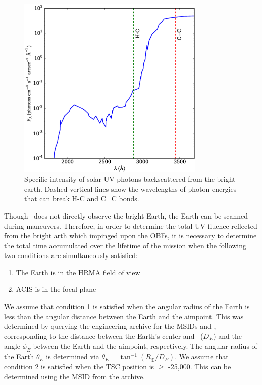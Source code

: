 \documentclass[11pt]{article}
\begin{document}
\begin{figure}
\begin{center}
\includegraphics[width=0.8\textwidth]{bright_earth_intensity.eps}
\caption{Specific intensity of solar UV photons backscattered from the bright earth. Dashed
vertical lines show the wavelengths of photon energies that can break H-C and C=C bonds.\label{fig:bright_earth_intensity}}
\end{center}
\end{figure}

Though \chandra~does not directly observe the bright Earth, the Earth can be scanned during
maneuvers. Therefore, in order to determine the total UV fluence reflected from the bright
arth which impinged upon the OBFs, it is necessary to determine the total time accumulated over
the lifetime of the mission when the following two conditions are simultaneously satisfied:

\begin{enumerate}
\item The Earth is in the HRMA field of view
\item ACIS is in the focal plane
\end{enumerate}

We assume that condition 1 is satisfied when the angular radius of the Earth is less than the
angular distance between the Earth and the aimpoint. This was determined by querying
the  engineering archive for the MSIDs  and ,
corresponding to the distance between the Earth's center and \chandra~($D_E$) and the angle $\phi_E$ between
the Earth and the aimpoint, respectively. The angular radius of the Earth $\theta_E$ is determined
via $\theta_E = \tan^{-1} (R_\oplus/D_E)$. We assume that condition 2 is satisfied when the TSC
position is $\geq$ -25,000. This can be determined using the MSID  from the 
archive.
\end{document}
